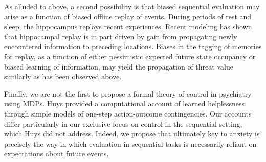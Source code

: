\documentclass[11pt]{article} %
\begin{document}
As alluded to above, a second possibility is that biased sequential evaluation may arise as a function of biased offline replay of events. During periods of rest and sleep, the hippocampus replays recent experiences. Recent modeling has shown that hippocampal replay is in part driven by gain from propagating newly encountered information to preceding locations. Biases in the tagging of memories for replay, as a function of either pessimistic expected future state occupancy or biased learning of information, may yield the propagation of threat value similarly as has been observed above. 

Finally, we are not the first to propose a formal theory of control in psychiatry using MDPs. Huys\cite{HuysDayan2009} provided a computational account of learned helplessness through simple models of one-step action-outcome contingencies. Our accounts differ particularly in our exclusive focus on control in the sequential setting, which Huys did not address. Indeed, we propose that ultimately key to anxiety is precisely the way in which evaluation in sequential tasks is necessarily reliant on expectations about future events.


\small{}
\end{document}
